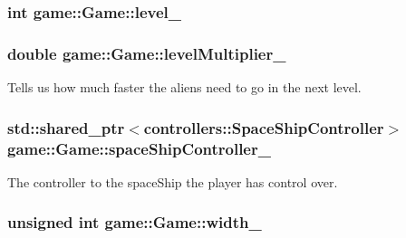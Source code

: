\hypertarget{classgame_1_1Game_a01f13242840529fa2be3c34c2c1ba1bc}{
\subsubsection[{level\-\_\-}]{\setlength{\rightskip}{0pt plus 5cm}int {\bf game\-::\-Game\-::level\-\_\-}}}\label{db/d26/classgame_1_1Game_a01f13242840529fa2be3c34c2c1ba1bc}
\hypertarget{classgame_1_1Game_ad094ca2b5b1429682bf43f171c3896d5}{
\subsubsection[{level\-Multiplier\-\_\-}]{\setlength{\rightskip}{0pt plus 5cm}double {\bf game\-::\-Game\-::level\-Multiplier\-\_\-}}}\label{db/d26/classgame_1_1Game_ad094ca2b5b1429682bf43f171c3896d5}


\-Tells us how much faster the aliens need to go in the next level. 

\hypertarget{classgame_1_1Game_a9893f7b2da64105ba99fb9826269ff37}{
\subsubsection[{space\-Ship\-Controller\-\_\-}]{\setlength{\rightskip}{0pt plus 5cm}std\-::shared\-\_\-ptr$<${\bf controllers\-::\-Space\-Ship\-Controller}$>$ {\bf game\-::\-Game\-::space\-Ship\-Controller\-\_\-}}}\label{db/d26/classgame_1_1Game_a9893f7b2da64105ba99fb9826269ff37}


\-The controller to the space\-Ship the player has control over. 

\hypertarget{classgame_1_1Game_a7fbf6984ea777ae7ab39d54d701f48e4}{
\subsubsection[{width\-\_\-}]{\setlength{\rightskip}{0pt plus 5cm}unsigned int {\bf game\-::\-Game\-::width\-\_\-}}}\label{db/d26/classgame_1_1Game_a7fbf6984ea777ae7ab39d54d701f48e4}


